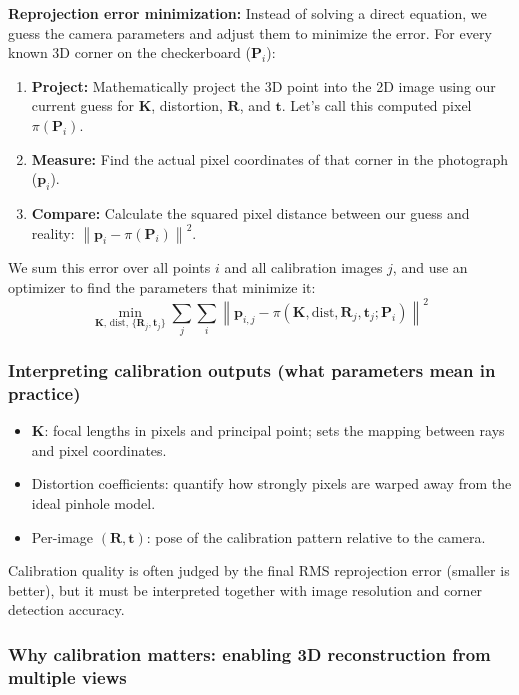 \documentclass[11pt,a4paper]{article}
\newcommand{\vct}[1]{\bm{#1}}
\newcommand{\mat}[1]{\mathbf{#1}}
\newcommand{\norm}[1]{\left\lVert#1\right\rVert}
\begin{document}
\begin{mathrule}
\textbf{Reprojection error minimization:}
Instead of solving a direct equation, we guess the camera parameters and adjust them to minimize the error. For every known 3D corner on the checkerboard ($\vct{P}_i$):
\begin{enumerate}
 \item \textbf{Project:} Mathematically project the 3D point into the 2D image using our current guess for $\mat{K}$, distortion, $\mat{R}$, and $\vct{t}$. Let's call this computed pixel $\pi(\vct{P}_i)$.
 \item \textbf{Measure:} Find the actual pixel coordinates of that corner in the photograph ($\vct{p}_i$).
 \item \textbf{Compare:} Calculate the squared pixel distance between our guess and reality: $\norm{\vct{p}_i - \pi(\vct{P}_i)}^2$.
\end{enumerate}
We sum this error over all points $i$ and all calibration images $j$, and use an optimizer to find the parameters that minimize it:
\[
\min_{\mat{K},\,\text{dist},\,\{\mat{R}_j,\vct{t}_j\}}
\sum_{j}\sum_{i}\norm{\vct{p}_{i,j} - \pi(\mat{K},\text{dist},\mat{R}_j,\vct{t}_j;\vct{P}_i)}^2
\]
\end{mathrule}

\subsubsection{Interpreting calibration outputs (what parameters mean in practice)}

\begin{itemize}
  \item $\mat{K}$: focal lengths in pixels and principal point; sets the mapping between rays and pixel coordinates.
  \item Distortion coefficients: quantify how strongly pixels are warped away from the ideal pinhole model.
  \item Per-image $(\mat{R},\vct{t})$: pose of the calibration pattern relative to the camera.
\end{itemize}

\begin{notebox}
Calibration quality is often judged by the final RMS reprojection error (smaller is better),
but it must be interpreted together with image resolution and corner detection accuracy.
\end{notebox}


\subsubsection{Why calibration matters: enabling 3D reconstruction from multiple views}
\end{document}
